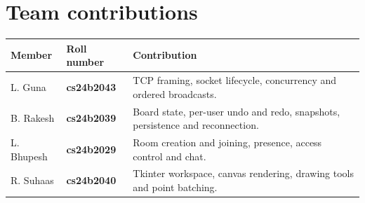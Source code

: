 \documentclass[11pt,a4paper]{article}
\begin{document}
\section{Team contributions}

\small
\begin{tabularx}{\linewidth}{@{}P{24mm}P{22mm}Y@{}}
\toprule
\textbf{Member} & \textbf{Roll number} & \textbf{Contribution}\\
\midrule
L. Guna & \textbf{cs24b2043} & TCP framing, socket lifecycle, concurrency and ordered broadcasts.\\
B. Rakesh & \textbf{cs24b2039} & Board state, per-user undo and redo, snapshots, persistence and reconnection.\\
L. Bhupesh & \textbf{cs24b2029} & Room creation and joining, presence, access control and chat.\\
R. Suhaas & \textbf{cs24b2040} & Tkinter workspace, canvas rendering, drawing tools and point batching.\\
\bottomrule
\end{tabularx}
\end{document}
